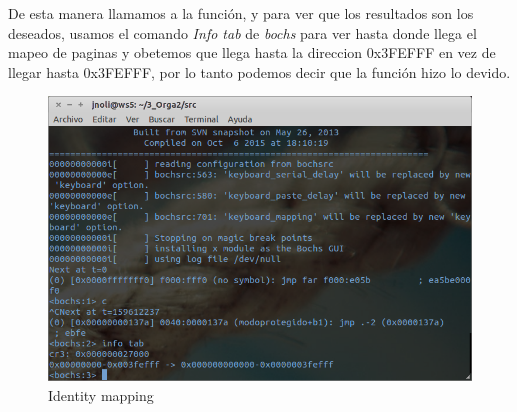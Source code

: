 	 De esta manera llamamos a la función, y para ver que los resultados son los deseados, usamos el comando \textit{Info tab} de \textit{bochs} para ver hasta donde llega el mapeo de paginas y obetemos que llega hasta la direccion 0x3FEFFF en vez de llegar hasta 0x3FEFFF, por lo tanto podemos decir que la función hizo lo devido.
 
	  \begin{figure}[H]
	  \begin{center}
  	  \includegraphics[width=\linewidth]{ejercicio3/unmaproof.png}
  	  \caption{{\small Identity mapping}}
	  \endminipage
	  \end{center}
	  \end{figure}
	




